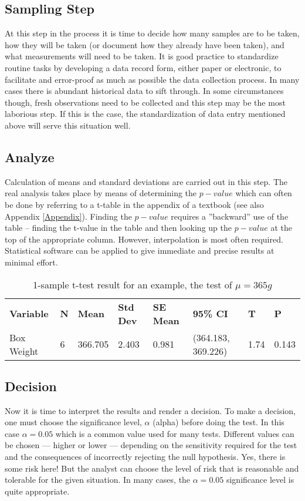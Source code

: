 \subsection{Sampling Step}
At this step in the process it is time to decide how many samples are to be taken, how they will be taken (or document how they already have been taken), and what measurements will need to be taken.  It is good practice to standardize routine tasks by developing a data record form, either paper or electronic, to facilitate and error-proof as much as possible the data collection process.  In many cases there is abundant historical data to sift through.  In some circumstances though, fresh observations need to be collected and this step may be the most laborious step.  If this is the case, the standardization of data entry mentioned above will serve this situation well.

\subsection{Analyze}
Calculation of means and standard deviations are carried out in this step.  The real analysis takes place by means of determining the $p-value$ which can often be done by referring to a t-table in the appendix of a textbook (see also Appendix \ref{Appendix}). Finding the $p-value$ requires a ''backward'' use of the table -- finding the t-value in the table and then looking up the $p-value$ at the top of the appropriate column.  However, interpolation is most often required. Statistical software can be applied to give immediate and precise results at minimal effort.

\begin{sidewaystable}
	\begin{center}
\begin{tabular}{llllllll}
\textbf{Variable} & \textbf{N} & \textbf{Mean} & \textbf{Std Dev} & \textbf{SE Mean} & \textbf{95\% CI} & \textbf{T} & \textbf{P} \\ \index{mean}
Box Weight & 6 & 366.705 & 2.403 & 0.981 & (364.183, 369.226) & 1.74 & 0.143 \\ 
\end{tabular} 
\end{center}
	\caption{1-sample t-test result for an example, the test of $ \mu = 365 g $ }
\end{sidewaystable}


\subsection{Decision}
Now it is time to interpret the results and render a decision.  To make a decision, one must choose the significance level, $\alpha$ (alpha) before doing the test.  In this case $\alpha = 0.05$ which is a common value used for many tests.  Different values can be chosen --- higher or lower --- depending on the sensitivity required for the test and the consequences of incorrectly rejecting the null hypothesis.  Yes, there is some risk here!  But the analyst can choose the level of risk that is reasonable and tolerable for the given situation.  In many cases, the $\alpha = 0.05$ significance level is quite appropriate.

